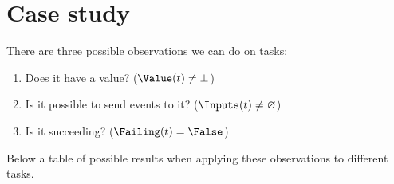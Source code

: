 
\section{Case study}

There are three possible observations we can do on tasks:
\begin{enumerate}
  \item Does it have a value? ($\Value(t) \neq \bot$)
  \item Is it possible to send events to it? ($\Inputs(t) \neq \nothing$)
  \item Is it succeeding? ($\Failing(t) = \False$)
\end{enumerate}
Below a table of possible results when applying these observations to different tasks.

